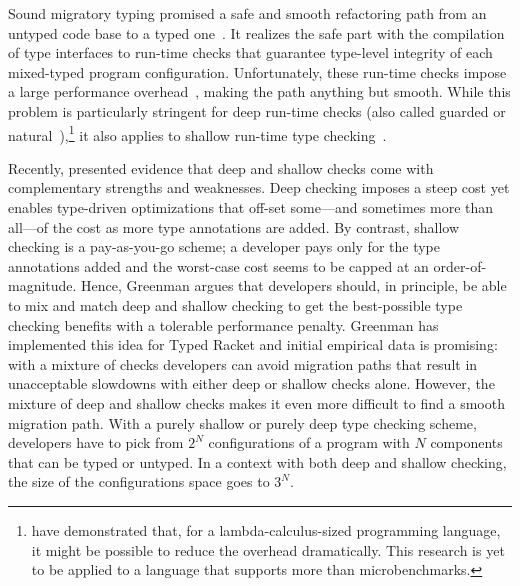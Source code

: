 
Sound migratory typing promised a safe and smooth refactoring path from an
untyped code base to a typed one~\cite{tf-dls-2006, tfffgksst-snapl-2017}. It
realizes the safe part with the compilation of type interfaces to run-time
checks that guarantee type-level integrity of each mixed-typed program configuration.
Unfortunately, these run-time checks impose a large performance
overhead~\cite{gtnffvf-jfp-2019}, making the path anything but smooth. While
this problem is particularly stringent for deep run-time checks (also called
guarded or natural~\cite{tf-dls-2006,st-sfp-2006}),\footnote{\citet{kas-pldi-2019}
have demonstrated that, for a lambda-calculus-sized programming language, it
might be possible to reduce the overhead dramatically. This research is yet to
be applied to a language that supports more than microbenchmarks.}
it also applies to shallow run-time type
checking~\cite{gm-pepm-2018,vksb-dls-2014,vss-popl-2017,v-thesis-2019,grmhn-vmil-2019,rmhn-ecoop-2019}.

Recently, \citet{g-thesis-2020,g-deep-shallow} presented evidence that deep and
shallow checks come with complementary strengths and weaknesses. Deep checking
imposes a steep cost yet enables type-driven optimizations that off-set
some---and sometimes more than all---of the cost as more type annotations are
added. By contrast, shallow checking is a pay-as-you-go scheme; a developer pays
only for the type annotations added and the worst-case cost seems to be capped
at an order-of-magnitude. Hence, Greenman argues that developers should, in
principle, be able to mix and match deep and shallow checking to get the
best-possible type checking benefits with a tolerable performance penalty.
Greenman has implemented this idea for Typed Racket and initial empirical data
is promising: with a mixture of checks developers can avoid migration paths that
result in unacceptable slowdowns with either deep or shallow checks alone.
However, the mixture of deep and shallow checks makes it even more difficult to
find a smooth migration path. With a purely shallow or purely deep type checking
scheme, developers have to pick from $2^N$ configurations of a program with $N$
components that can be typed or untyped. In a context with both deep and shallow
checking, the size of the configurations space goes to $3^N$.

